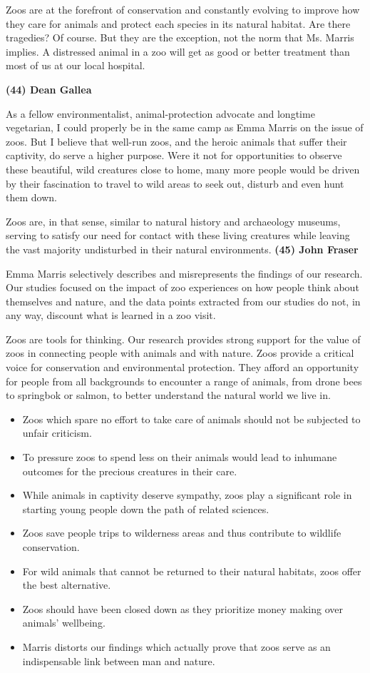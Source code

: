 \documentclass[UTF8,11pt]{ctexart}
\begin{document}
Zoos are at the forefront of conservation and constantly evolving to improve how they care for animals and protect each species in its natural habitat. Are there tragedies? Of course. But they are the exception, not the norm that Ms. Marris implies. A distressed animal in a zoo will get as good or better treatment than most of us at our local hospital.


\textbf{(44) Dean Gallea}


As a fellow environmentalist, animal-protection advocate and longtime vegetarian, I could properly be in the same camp as Emma Marris on the issue of zoos. But I believe that well-run zoos, and the heroic animals that suffer their captivity, do serve a higher purpose. Were it not for opportunities to observe these beautiful, wild creatures close to home, many more people would be driven by their fascination to travel to wild areas to seek out, disturb and even hunt them down.


Zoos are, in that sense, similar to natural history and archaeology museums, serving to satisfy our need for contact with these living creatures while leaving the vast majority undisturbed in their natural environments. \textbf{(45) John Fraser}


Emma Marris selectively describes and misrepresents the findings of our research. Our studies focused on the impact of zoo experiences on how people think about themselves and nature, and the data points extracted from our studies do not, in any way, discount what is learned in a zoo visit.


Zoos are tools for thinking. Our research provides strong support for the value of zoos in connecting people with animals and with nature. Zoos provide a critical voice for conservation and environmental protection. They afford an opportunity for people from all backgrounds to encounter a range of animals, from drone bees to springbok or salmon, to better understand the natural world we live in.


\begin{itemize}[leftmargin=2em,itemsep=.2em,topsep=.4em]\item[A.] Zoos which spare no effort to take care of animals should not be subjected to unfair criticism.
\item[B.] To pressure zoos to spend less on their animals would lead to inhumane outcomes for the precious creatures in their care.
\item[C.] While animals in captivity deserve sympathy, zoos play a significant role in starting young people down the path of related sciences.
\item[D.] Zoos save people trips to wilderness areas and thus contribute to wildlife conservation.
\item[E.] For wild animals that cannot be returned to their natural habitats, zoos offer the best alternative.
\item[F.] Zoos should have been closed down as they prioritize money making over animals’ wellbeing.
\item[G.] Marris distorts our findings which actually prove that zoos serve as an indispensable link between man and nature.
\end{itemize}
\end{document}
